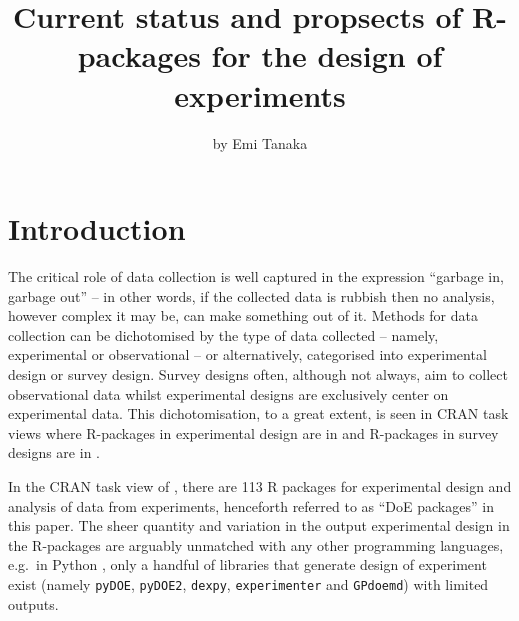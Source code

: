 \title{Current status and propsects of R-packages for the design of
experiments}
\author{by Emi Tanaka}

\maketitle


\hypertarget{introduction}{%
\section{Introduction}\label{introduction}}

The critical role of data collection is well captured in the expression
``garbage in, garbage out'' -- in other words, if the collected data is
rubbish then no analysis, however complex it may be, can make something
out of it. Methods for data collection can be dichotomised by the type
of data collected -- namely, experimental or observational -- or
alternatively, categorised into experimental design or survey design.
Survey designs often, although not always, aim to collect observational
data whilst experimental designs are exclusively center on experimental
data. This dichotomisation, to a great extent, is seen in CRAN task
views where R-packages in experimental design are in
 and R-packages in survey designs are in
.

In the CRAN task view of , there are 113 R
packages for experimental design and analysis of data from experiments,
henceforth referred to as ``DoE packages'' in this paper. The sheer
quantity and variation in the output experimental design in the
R-packages are arguably unmatched with any other programming languages,
e.g.~in Python \citep{python}, only a handful of libraries that generate
design of experiment exist (namely \texttt{pyDOE}, \texttt{pyDOE2},
\texttt{dexpy}, \texttt{experimenter} and \texttt{GPdoemd}) with limited
outputs.

